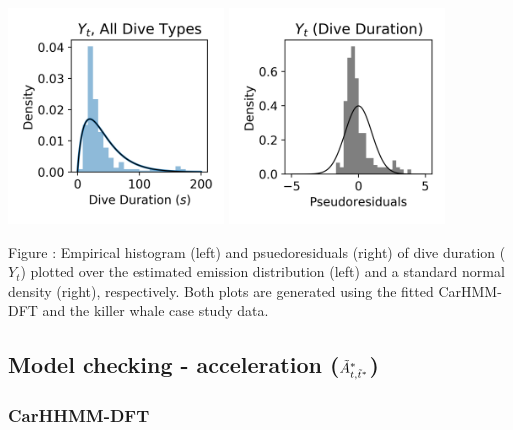 \documentclass{article}
\begin{document}
        \begin{center}
        \includegraphics[width=2.25in]{../Plots/CarHMM_empirical_hist_dive_duration.png}
        \includegraphics[width=2.25in]{../Plots/CarHMM_psedoresids_Dive_Duration.png}
        \end{center}
        
        \noindent Figure : Empirical histogram (left) and psuedoresiduals (right) of dive duration ($Y_{t}$) plotted over the estimated emission distribution (left) and a standard normal density (right), respectively. Both plots are generated using the fitted CarHMM-DFT and the killer whale case study data.
        \addtocounter{fignum}{1}
        
    \newpage
    \subsection{Model checking - acceleration ($\tilde{A}^*_{t,\tilde t^*}$)}
        
        \subsubsection{CarHHMM-DFT}
        
\end{document}
